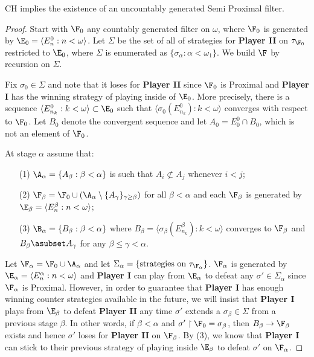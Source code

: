 \documentclass{article}
\begin{document}
\begin{prop}
    CH implies the existence of an uncountably generated Semi Proximal filter.
\end{prop}
\begin{proof}
Start with \(\F_0\) any countably generated filter on \(\omega\), where \(\F_0\) is generated by \(\E_0 = \langle E_n^0:n < \omega\rangle\). Let \(\Sigma\) be the set of all of strategies for \textbf{Player II} on \(\tau_{\F_0}\) restricted to \(\E_0\), where \(\Sigma\) is enumerated as \(\{\sigma_{\alpha}:\alpha < \omega_1\}\). We build \(\F\) by recursion on \(\Sigma\).

Fix \(\sigma_0 \in \Sigma\) and note that it loses for \textbf{Player II} since \(\F_0\) is Proximal and \textbf{Player I} has the winning strategy of playing inside of \(\E_0\). More precisely, there is a sequence \(\langle E_{n_k}^0: k < \omega \rangle \subset \E_0\) such that \(\langle \sigma_0\left(E_{n_k}^0\right):k < \omega\rangle\) converges with respect to \(\F_0\). Let \(B_0\) denote the convergent sequence and  let \(A_0 = E_0^0\cap B_0\), which is not an element of \(\F_0\).

At stage \(\alpha\) assume that:
\begin{enumerate}
    \item[(1)] \(\A_{\alpha} = \{A_{\beta}:\beta < \alpha\}\) is such that \(A_i \not \subset A_j\) whenever \(i < j\);
    \item[(2)] \(\F_{\beta} = \F_0\cup\left(\A_{\alpha}\setminus\{A_{\gamma}\}_{\gamma \geq \beta}\right)\) for all \(\beta < \alpha\) and each \(\F_{\beta}\) is generated by \(\E_{\beta} =\langle E_n^{\beta}:n < \omega\rangle\);
    \item[(3)] \(\B_{\alpha} = \{B_{\beta}:\beta < \alpha\}\) where \(B_{\beta} = \langle \sigma_{\beta}(E_{n_k}^{\beta}):k < \omega\rangle\) converges to \(\F_{\beta}\) and \(B_{\beta} \asubset  A_{\gamma}\) for any \(\beta \leq \gamma < \alpha\).
\end{enumerate}
Let \(\F_{\alpha} = \F_0 \cup \A_{\alpha}\) and let \(\Sigma_{\alpha} = \{\text{strategies on $\tau_{\F_\alpha}$}\}\). \(\F_{\alpha}\) is  generated by \(\E_{\alpha} = \langle E_n^{\alpha}: n < \omega \rangle\) and \textbf{Player I} can play from \(\E_{\alpha}\) to defeat any \(\sigma' \in \Sigma_{\alpha}\) since \(\F_{\alpha}\) is Proximal. However, in order to guarantee that \textbf{Player I} has enough winning counter strategies available in the future, we will insist that \textbf{Player I} plays from \(\E_{\beta}\) to defeat \textbf{Player II} any time \(\sigma'\) extends a \(\sigma_{\beta} \in \Sigma\) from a previous stage \(\beta\).  In other words, if \(\beta < \alpha\) and \(\sigma'\upharpoonright \F_0 = \sigma_{\beta}\), then \(B_{\beta}\to\F_{\beta}\) exists and hence \(\sigma'\) loses for \textbf{Player II} on \(\F_{\beta}\). By (3), we know that \textbf{Player I} can stick to their previous strategy of playing inside \(\E_{\beta}\) to defeat \(\sigma'\) on \(\F_{\alpha}\).


\end{proof}
\end{document}
